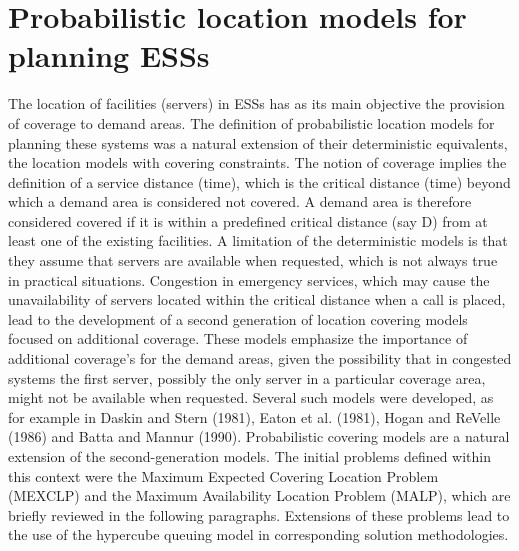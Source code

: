 \section{Probabilistic location models for planning ESSs}
The location of facilities (servers) in ESSs
has as its main objective
the provision of coverage to demand areas.
The definition of
probabilistic location models for planning these systems
was a natural extension
of their deterministic equivalents,
the location models with covering constraints.
The notion of coverage
implies
the definition of a service distance (time),
which is the critical distance (time)
beyond which a demand area is considered not covered.
A demand area is
therefore
considered covered
if
it is within a predefined critical distance (say D)
from at least one of the existing facilities.
A limitation of the deterministic models
is that
they assume
that servers are available when requested,
which is not always true in practical situations.
Congestion in emergency services,
which may cause
the unavailability
of servers located
within the critical distance
when a call is placed,
lead to
the development of
a second generation of location covering models
focused on additional coverage.
These models
emphasize the importance of additional coverage's
for the demand areas,
given the possibility that
in congested systems
the first server,
possibly
the only server in a particular coverage area,
might not be available when requested.
Several such models were developed,
as for example in Daskin and Stern (1981),
Eaton et al. (1981),
Hogan and ReVelle (1986)
and Batta and Mannur (1990).
Probabilistic covering models
are a natural extension
of the second-generation models.
The initial problems
defined within this context
were
the Maximum Expected Covering Location Problem (MEXCLP)
and
the Maximum Availability Location Problem (MALP),
which are briefly reviewed
in the following paragraphs.
Extensions of these problems
lead to the use
of the hypercube queuing model
in corresponding solution methodologies.
